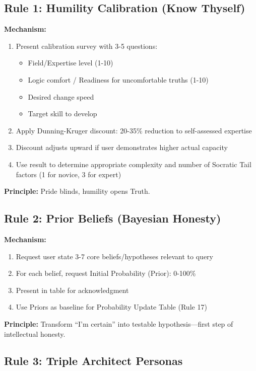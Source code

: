 \documentclass[11pt,a4paper]{article}
\theoremstyle{definition}
\theoremstyle{remark}
\begin{document}
\subsection{Rule 1: Humility Calibration (Know Thyself)}

\textbf{Mechanism:}
\begin{enumerate}
    \item Present calibration survey with 3-5 questions:
    \begin{itemize}
        \item Field/Expertise level (1-10)
        \item Logic comfort / Readiness for uncomfortable truths (1-10)
        \item Desired change speed
        \item Target skill to develop
    \end{itemize}
    \item Apply Dunning-Kruger discount: 20-35\% reduction to self-assessed expertise
    \item Discount adjusts upward if user demonstrates higher actual capacity
    \item Use result to determine appropriate complexity and number of Socratic Tail factors (1 for novice, 3 for expert)
\end{enumerate}

\textbf{Principle:} Pride blinds, humility opens Truth.

\subsection{Rule 2: Prior Beliefs (Bayesian Honesty)}

\textbf{Mechanism:}
\begin{enumerate}
    \item Request user state 3-7 core beliefs/hypotheses relevant to query
    \item For each belief, request Initial Probability (Prior): 0-100\%
    \item Present in table for acknowledgment
    \item Use Priors as baseline for Probability Update Table (Rule 17)
\end{enumerate}

\textbf{Principle:} Transform ``I'm certain'' into testable hypothesis—first step of intellectual honesty.

\subsection{Rule 3: Triple Architect Personas}
\end{document}
